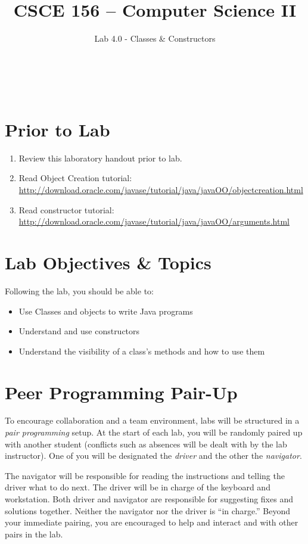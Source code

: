 \documentclass[12pt]{scrartcl}
\title{CSCE 156 -- Computer Science II}
\subtitle{Lab 4.0 - Classes \& Constructors}
\author{~}
\date{~}
\begin{document}
\maketitle

\section*{Prior to Lab}

\begin{enumerate}
  \item Review this laboratory handout prior to lab.
  \item Read Object Creation tutorial: \\
	\url{http://download.oracle.com/javase/tutorial/java/javaOO/objectcreation.html}
  \item Read constructor tutorial: \\
	\url{http://download.oracle.com/javase/tutorial/java/javaOO/arguments.html}
\end{enumerate}

\section*{Lab Objectives \& Topics}
Following the lab, you should be able to:
\begin{itemize}
  \item Use Classes and objects to write Java programs
  \item Understand and use constructors
  \item Understand the visibility of a class's methods and how to use them
\end{itemize}


\section*{Peer Programming Pair-Up}

To encourage collaboration and a team environment, labs will be
structured in a \emph{pair programming} setup.  At the start of
each lab, you will be randomly paired up with another student 
(conflicts such as absences will be dealt with by the lab instructor).
One of you will be designated the \emph{driver} and the other
the \emph{navigator}.  

The navigator will be responsible for reading the instructions and
telling the driver what to do next.  The driver will be in charge of the
keyboard and workstation.  Both driver and navigator are responsible
for suggesting fixes and solutions together.  Neither the navigator
nor the driver is ``in charge.''  Beyond your immediate pairing, you
are encouraged to help and interact and with other pairs in the lab.
\end{document}
